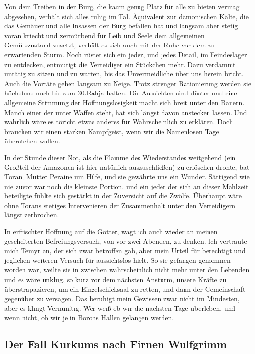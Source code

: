 Von dem Treiben in der Burg, die kaum genug Platz für alle zu bieten vermag abgesehen, verhält sich alles ruhig im Tal. Äquivalent zur dämonischen Kälte, die das Gemäuer und alle Insassen der Burg befallen hat und langsam aber stetig voran kriecht und zermürbend für Leib und Seele dem allgemeinen Gemütszustand zusetzt, verhält es sich auch mit der Ruhe vor dem zu erwartenden Sturm. Noch rüstet sich ein jeder, und jedes Detail, im Feindeslager zu entdecken, entmutigt die Verteidiger ein Stückchen mehr. Dazu verdammt untätig zu sitzen und zu warten, bis das Unvermeidliche über uns herein bricht. Auch die Vorräte gehen langsam zu Neige. Trotz strenger Rationierung werden sie höchstens noch bis zum 30.Rahja halten. Die Aussichten sind düster und eine allgemeine Stimmung der Hoffnungslosigkeit macht sich breit unter den Bauern. Manch einer der unter Waffen steht, hat sich längst davon anstecken lassen. Und wahrlich wäre es töricht etwas anderes für Wahrscheinlich zu erklären. Doch brauchen wir einen starken Kampfgeist, wenn wir die Namenlosen Tage überstehen wollen.

In der Stunde dieser Not, als die Flamme des Wiederstandes weitgehend (ein Großteil der Amazonen ist hier natürlich auszuschließen) zu erlöschen drohte, bat Toran, Mutter Peraine um Hilfe, und sie gewährte uns ein Wunder. Sättigend wie nie zuvor war noch die kleinste Portion, und ein jeder der sich an dieser Mahlzeit beteiligte fühlte sich gestärkt in der Zuversicht auf die Zwölfe.
Überhaupt wäre ohne Torans stetiges Intervenieren der Zusammenhalt unter den Verteidigern längst zerbrochen.

In erfrischter Hoffnung auf die Götter, wagt ich auch wieder an meinen gescheiterten Befreiungsversuch, von vor zwei Abenden, zu denken. Ich vertraute mich Temyr an, der sich zwar betroffen gab, aber mein Urteil für berechtigt und jeglichen weiteren Versuch für aussichtslos hielt. So sie gefangen genommen worden war, weilte sie in zwischen wahrscheinlich nicht mehr unter den Lebenden und es wäre unklug, so kurz vor dem nächsten Ansturm, unsere Kräfte zu überstrapazieren, um ein Einzelschicksaal zu retten, und dann der Gemeinschaft gegenüber zu versagen. Das beruhigt mein Gewissen zwar nicht im Mindesten, aber es klingt Vernünftig. Wer weiß ob wir die nächsten Tage überleben, und wenn nicht, ob wir je in Borons Hallen gelangen werden.

\subsection{Der Fall Kurkums nach Firnen Wulfgrimm}
